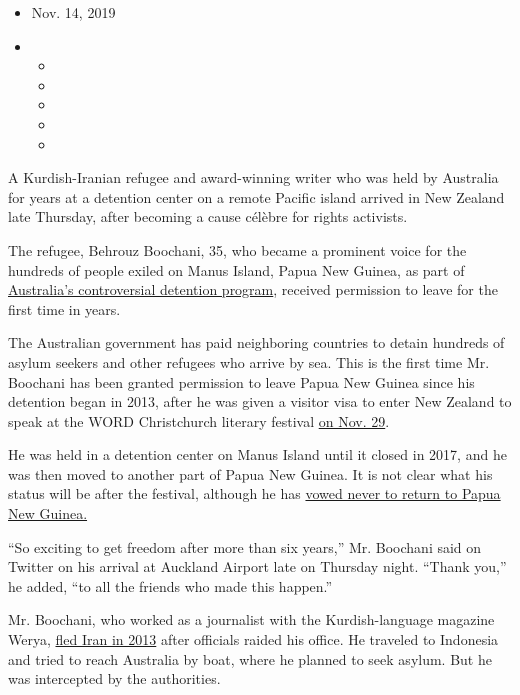 \begin{itemize}
\item
  Nov. 14, 2019
\item
  \begin{itemize}
  \item
  \item
  \item
  \item
  \item
  \end{itemize}
\end{itemize}

A Kurdish-Iranian refugee and award-winning writer who was held by
Australia for years at a detention center on a remote Pacific island
arrived in New Zealand late Thursday, after becoming a cause célèbre for
rights activists.

The refugee, Behrouz Boochani, 35, who became a prominent voice for the
hundreds of people exiled on Manus Island, Papua New Guinea, as part of
\href{https://www.nytimes.com/2018/07/21/world/australia/australia-refugee-policy-protest.html}{Australia's
controversial detention program}, received permission to leave for the
first time in years.

The Australian government has paid neighboring countries to detain
hundreds of asylum seekers and other refugees who arrive by sea. This is
the first time Mr. Boochani has been granted permission to leave Papua
New Guinea since his detention began in 2013, after he was given a
visitor visa to enter New Zealand to speak at the WORD Christchurch
literary festival
\href{https://wordchristchurch.co.nz/programme/behrouz-boochani/}{on
Nov. 29}.

He was held in a detention center on Manus Island until it closed in
2017, and he was then moved to another part of Papua New Guinea. It is
not clear what his status will be after the festival, although he has
\href{https://www.theguardian.com/australia-news/2019/nov/14/behrouz-boochani-free-voice-manus-island-refugees-new-zealand-australia}{vowed
never to return to Papua New Guinea.}

``So exciting to get freedom after more than six years,'' Mr. Boochani
said on Twitter on his arrival at Auckland Airport late on Thursday
night. ``Thank you,'' he added, ``to all the friends who made this
happen.''

Mr. Boochani, who worked as a journalist with the Kurdish-language
magazine Werya,
\href{https://www.nytimes.com/2017/02/13/insider/manus-island-refugee-australia.html?module=inline}{fled
Iran in 2013} after officials raided his office. He traveled to
Indonesia and tried to reach Australia by boat, where he planned to seek
asylum. But he was intercepted by the authorities.

